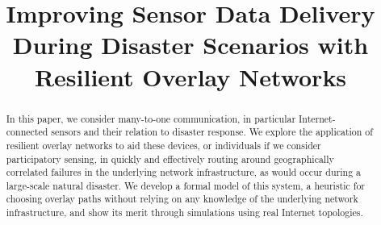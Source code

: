 \documentclass[conference]{IEEEtran}
\begin{document}
%
\title{Improving Sensor Data Delivery During Disaster Scenarios with Resilient Overlay Networks}

\author{
}



\maketitle


\newcommand{\numruns}{200 }
\newcommand{\pfail}{p(fail) }



\begin{abstract}

In this paper, we consider many-to-one communication, in particular Internet-connected sensors and their relation to disaster response.
We explore the application of resilient overlay networks to aid these devices, or individuals if we consider participatory sensing,  in quickly and effectively routing around geographically correlated failures in the underlying network infrastructure, as would occur during a large-scale natural disaster.
We develop a formal model of this system, a heuristic for choosing overlay paths without relying on any knowledge of the underlying network infrastructure, and show its merit through simulations using real Internet topologies.

\end{abstract}

%
\IEEEpeerreviewmaketitle
\end{document}
